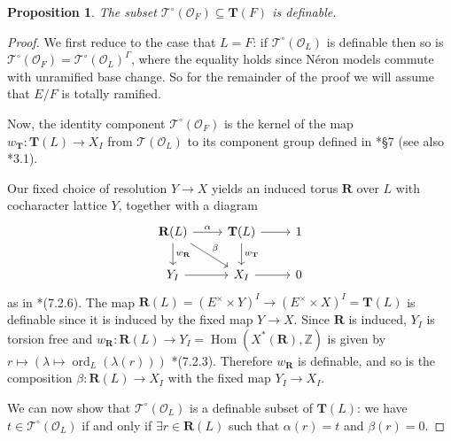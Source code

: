 \documentclass{amsart}
\newcommand{\Z}{{\mathbb Z}}
\newcommand{\ri}{\mathcal{O}}
\DeclareMathOperator{\ord}{ord}
\DeclareMathOperator{\Hom}{Hom}
\newcommand{\bT}{\mathbf {T}}
\newcommand{\bR}{\mathbf{R}}
\newcommand{\Ner}[1]{\mathcal{#1}}
\newcommand{\NerC}[1]{\mathcal{#1}^\circ}
\theoremstyle{plain}
\newtheorem{prop}[thm]{Proposition}
\theoremstyle{definition}
\begin{document}
\begin{prop} \label{prop:NerCdefinable}
The subset $\NerC{T}(\ri_F) \subseteq \bT(F)$ is definable.
\end{prop}
\begin{proof}
We first reduce to the case that $L = F$: if $\NerC{T}(\ri_L)$ is definable then so is
$\NerC{T}(\ri_F) = \NerC{T}(\ri_L)^\Gamma$, where the equality holds since N\'eron models commute with unramified base change.
So for the remainder of the proof we will assume that $E/F$ is totally ramified.

Now, the identity component $\NerC{T}(\ri_F)$ is the kernel of the map $w_\bT : \bT(L) \to X_I$ from
$\Ner{T}(\ri_L)$ to its component group  defined in \cite{kottwitz:isocrystals-2}*{\S 7} (see also \cite{bitan:11a}*{3.1}).

Our fixed choice of resolution $Y \to X$ yields an induced torus $\bR$ over $L$ with cocharacter lattice $Y$, together with a diagram
\[
\begin{tikzcd}
\bR(L) \rar{\alpha} \dar{w_{\bR}} \drar{\beta} & \bT(L) \rar \dar{w_{\bT}} & 1 \\
Y_I \rar & X_I \rar & 0
\end{tikzcd}
\]
as in \cite{kottwitz:isocrystals-2}*{(7.2.6)}.  The map $\bR(L) = (E^\times \times Y)^I \to (E^\times \times X)^I = \bT(L)$
is definable since it is induced by the fixed map $Y \to X$.  Since $\bR$ is induced,
$Y_I$ is torsion free and $w_\bR : \bR(L) \to Y_I = \Hom(X^\ast(\bR), \Z)$ is given by
$r \mapsto \left(\lambda \mapsto \ord_{L}(\lambda(r))\right)$ \cite{kottwitz:isocrystals-2}*{(7.2.3)}.
Therefore $w_\bR$ is definable, and so is the composition $\beta : \bR(L) \to X_I$ with the fixed map $Y_I \to X_I$.

We can now show that $\NerC{T}(\ri_L)$ is a definable subset of $\bT(L)$: we have $t \in \NerC{T}(\ri_L)$
if and only if $\exists r \in \bR(L)$ such that $\alpha(r) = t$ and $\beta(r) = 0$.
\end{proof}
\end{document}
